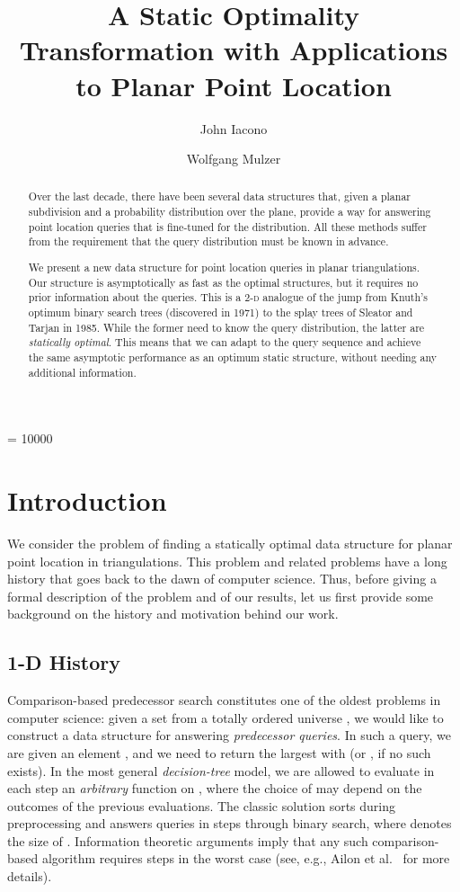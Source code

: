 \documentclass[11pt]{article}
\title{A Static Optimality Transformation with Applications\\ 
to Planar Point Location}
\author{
John Iacono \and Wolfgang Mulzer
}
\newcommand{\etal}{et al.}
\begin{document}
\widowpenalty = 10000

\maketitle

\begin{abstract} 
Over the last decade, there have been several data
structures that, given a planar subdivision and a probability 
distribution over the 
plane, provide a way for answering point location queries that is 
fine-tuned for the 
distribution. All these  methods suffer from the requirement that the query
distribution must be known in advance. 

We present a new data structure for point location queries in 
planar triangulations. Our structure is asymptotically as
fast as the optimal structures, but it requires no prior
information about the queries. 
This is a \textsc{2-d} analogue of the jump from Knuth's
optimum binary search trees (discovered in 1971) to the splay trees of 
Sleator and Tarjan in 1985. While the former need to know the
query distribution, the latter are \emph{statically optimal}.
This means that we 
can adapt to the query sequence and 
achieve the same asymptotic performance as an
optimum static structure, without needing any 
additional information.  
\end{abstract}







\section{Introduction}

We consider the problem of finding a statically optimal data structure
for planar point location in triangulations. This problem and related
problems have a long history that goes back to the dawn of computer science.
Thus, before giving a formal description of the problem and of our results,
let us first provide some background on the history and motivation behind
our work.

\subsection{{1-D} History}

Comparison-based predecessor search constitutes one of the oldest problems
in computer science: given a set  from a totally ordered universe
, we would like to construct a data structure for answering 
\emph{predecessor queries}. 
In such a query, we are given an element , and we need to return 
the largest  with  (or , if no
such  exists). In the most general \emph{decision-tree} model, 
we are allowed to evaluate 
in each step an \emph{arbitrary} function  on ,
where the choice of  may depend on the outcomes of the previous evaluations.
The classic solution sorts  during preprocessing and
answers queries in  steps through binary search, where
 denotes the size of .
Information theoretic arguments imply that any such comparison-based algorithm 
requires 
steps in the worst case (see, e.g., Ailon \etal~\cite[Section~2]{AilonChClLiMuSe11}
for more details).
\end{document}
